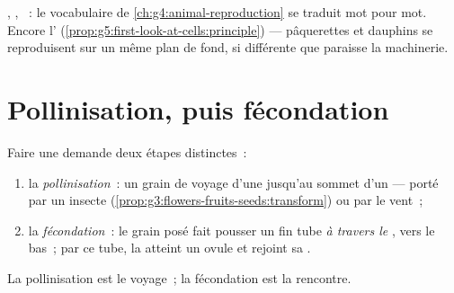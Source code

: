 \begin{remark}\label{rem:g5:flower-to-fruit:sameplan}
, , ~: le vocabulaire de
\cref{ch:g4:animal-reproduction} se traduit mot pour mot. Encore
l' (\cref{prop:g5:first-look-at-cells:principle}) ---
pâquerettes et dauphins se reproduisent sur un même plan de fond,
si différente que paraisse la machinerie.
\end{remark}

\section{Pollinisation, puis fécondation}

\begin{definition}\label{def:g5:flower-to-fruit:steps}
Faire une  demande deux étapes distinctes~:
\begin{enumerate}
  \item la \emph{pollinisation}~: un grain de
         voyage d'une  jusqu'au sommet d'un  ---
        porté par un insecte
        (\cref{prop:g3:flowers-fruits-seeds:transform}) ou par le
        vent~;
  \item la \emph{fécondation}~: le
        grain posé fait pousser un fin tube \emph{à travers le
        }, vers le bas~; par ce tube, la  atteint
        un ovule et rejoint sa .
\end{enumerate}
La pollinisation est le voyage~; la fécondation est la rencontre.
\end{definition}

